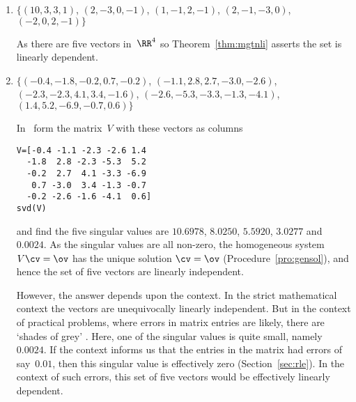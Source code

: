 \begin{example}
\begin{enumerate}
\item \(\{(10,3,3,1)\), \(( 2,-3,0,-1)\), \(( 1,-1,2,-1)\), \(( 2,-1,-3,0)\), \((-2,0,2,-1)\}\)
\begin{solution} 
As there are five vectors in~\(\RR^4\) so Theorem~\ref{thm:mgtnli} asserts the set is linearly dependent.
\end{solution}



\item \(\{(-0.4,-1.8,-0.2, 0.7,-0.2)\), \((-1.1, 2.8, 2.7,-3.0,-2.6)\), \((-2.3,-2.3, 4.1, 3.4,-1.6)\), \((-2.6,-5.3,-3.3,-1.3,-4.1)\), \(( 1.4, 5.2,-6.9,-0.7, 0.6)\}\)
\begin{solution} 
In \script\ form the matrix~\(V\) with these vectors as columns
\begin{verbatim}
V=[-0.4 -1.1 -2.3 -2.6 1.4
  -1.8  2.8 -2.3 -5.3  5.2
  -0.2  2.7  4.1 -3.3 -6.9
   0.7 -3.0  3.4 -1.3 -0.7
  -0.2 -2.6 -1.6 -4.1  0.6]
svd(V)
\end{verbatim}
\setbox\ajrqrbox\hbox{}%
\marginpar{\usebox{\ajrqrbox}}%
and find the five singular values are \(10.6978\), \(8.0250\), \(5.5920\), \(3.0277\) and~\(0.0024\).
As the singular values are all non-zero, the homogeneous system \(V\cv=\ov\) has the unique solution \(\cv=\ov\) (Procedure~\ref{pro:gensol}), and hence the set of five vectors are linearly independent.

However, the answer depends upon the context.  
In the strict mathematical context the vectors are unequivocally linearly independent.
But in the context of practical problems, where errors in matrix entries are likely, there are `shades of grey' . 
Here, one of the singular values is quite small, namely~\(0.0024\).
If the context informs us that the entries in the matrix had errors of say~\(0.01\), then this singular value is effectively zero (Section~\ref{sec:rle}).
In the context of such errors, this set of five vectors would be effectively linearly dependent.
\end{solution}


\end{enumerate}
\end{example}













